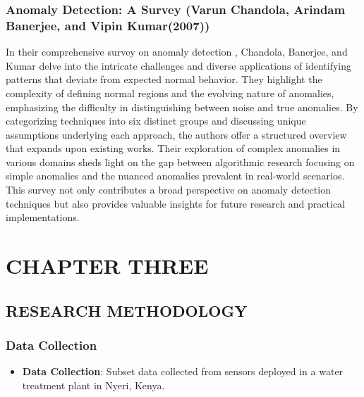 \documentclass[12pt]{report}
\begin{document}
\subsubsection{Anomaly Detection: A Survey (Varun Chandola, Arindam Banerjee, and Vipin Kumar(2007))}
In their comprehensive survey on anomaly detection \cite{paper5}, Chandola, Banerjee, and Kumar delve into the intricate challenges and diverse applications of identifying patterns that deviate from expected normal behavior. They highlight the complexity of defining normal regions and the evolving nature of anomalies, emphasizing the difficulty in distinguishing between noise and true anomalies. By categorizing techniques into six distinct groups and discussing unique assumptions underlying each approach, the authors offer a structured overview that expands upon existing works. Their exploration of complex anomalies in various domains sheds light on the gap between algorithmic research focusing on simple anomalies and the nuanced anomalies prevalent in real-world scenarios. This survey not only contributes a broad perspective on anomaly detection techniques but also provides valuable insights for future research and practical implementations.
\clearpage 

\section{\centering CHAPTER THREE}
\subsection{\centering RESEARCH METHODOLOGY}

\subsubsection{Data Collection}
\begin{itemize}
    \item \textbf{Data Collection}: Subset data collected from sensors deployed in a water treatment plant in Nyeri, Kenya.
\end{itemize}
\end{document}
